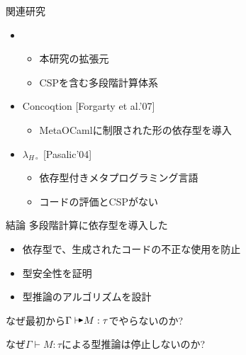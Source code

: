 \documentclass[dvipdfmx,aspectratio=169, 20pt]{beamer}
\renewcommand{\V}{\vdash}
\begin{document}
\begin{frame}[fragile]{関連研究}
    \begin{itemize}
        \item {}
            \begin{itemize}
                    \item 本研究の拡張元
                    \item CSPを含む多段階計算体系
            \end{itemize}
        \item Concoqtion [Forgarty et al.'07]
            \begin{itemize}
                \item MetaOCamlに制限された形の依存型を導入
            \end{itemize}
        \item \( \lambda_{H\circ} \) [Pasalic'04]
            \begin{itemize}
                \item 依存型付きメタプログラミング言語
                \item コードの評価とCSPがない
            \end{itemize}
    \end{itemize}
\end{frame}

\begin{frame}[fragile]{結論}
    多段階計算に依存型を導入した
    \begin{itemize}
        \item 依存型で、生成されたコードの不正な使用を防止
        \item 型安全性を証明 
        \item 型推論のアルゴリズムを設計 
    \end{itemize}
\end{frame}

\begin{frame}[fragile]{なぜ最初から$\Gamma \AV M : \tau$でやらないのか?}
\end{frame}

\begin{frame}[fragile]{なぜ$\Gamma \V M : \tau$による型推論は停止しないのか?}
\end{frame}
\end{document}
